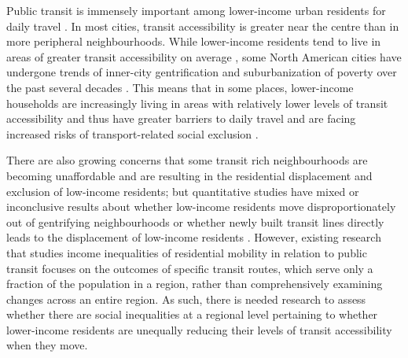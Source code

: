 Public transit is immensely important among lower-income urban residents for daily travel \cite{sanchez_transit_2004,giuliano_low_2005,kramer_unaffordable_2018,barri_can_2021}. In most cities, transit accessibility is greater near the centre than in more peripheral neighbourhoods. While lower-income residents tend to live in areas of greater transit accessibility on average \cite{deboosere_evaluating_2018,allen_sizing_2019}, some North American cities have undergone trends of inner-city gentrification and suburbanization of poverty over the past several decades \cite{kneebone_suburbanization_2010,ehrenhalt_great_2012,ades_are_2012, grant_changing_2020}. This means that in some places, lower-income households are increasingly living in areas with relatively lower levels of transit accessibility and thus have greater barriers to daily travel and are facing increased risks of transport-related social exclusion \cite{allen_suburbanization_2021,liu_suburbanization_2021}. 

There are also growing concerns that some transit rich neighbourhoods are becoming unaffordable and are resulting in the residential displacement and exclusion of low-income residents; but quantitative studies have mixed or inconclusive results about whether low-income residents move disproportionately out of gentrifying neighbourhoods or whether newly built transit lines directly leads to the displacement of low-income residents \cite{rayle_investigating_2015, zuk_gentrification_2018,padeiro_transit-oriented_2019,delmelle_transit-induced_2021}. However, existing research that studies income inequalities of residential mobility in relation to public transit focuses on the outcomes of specific transit routes, which serve only a fraction of the population in a region, rather than comprehensively examining changes across an entire region. As such, there is needed research to assess whether there are social inequalities at a regional level pertaining to whether lower-income residents are unequally reducing their levels of transit accessibility when they move. 

